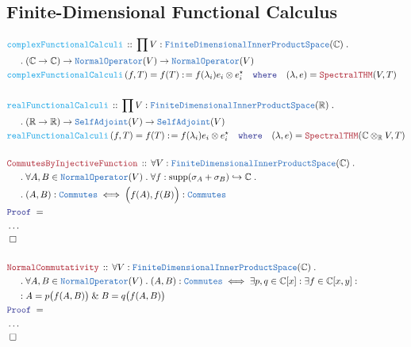 \documentclass[12pt]{scrartcl}%
\newcommand{\TYPE}[1]{\textcolor{NavyBlue}{\mathtt{#1}}}%
\newcommand{\FUNC}[1]{\textcolor{Cerulean}{\mathtt{#1}}}%
\newcommand{\LOGIC}[1]{\textcolor{Blue}{\mathtt{#1}}}%
\newcommand{\THM}[1]{\textcolor{Maroon}{\mathtt{#1}}}%
\renewcommand{\.}{\; . \;} %
\newcommand{\de}{: \kern 0.1pc =} %
\newcommand{\where}{\LOGIC{where}} %
\newcommand{\Act}[1]{\left( #1 \right)} %
\newcommand{\Theorem}[2]{& \THM{#1} \, :: \, #2 \\ & \Proof = \\ } %
\newcommand{\DeclareFunc}[2]{& \FUNC{#1} \, :: \, #2 \\}%
\newcommand{\DefineNamedFunc}[4]{&  \FUNC{#1}\Act{#2} = #3 \de #4 \\}%
\newcommand{\NewLine}{\\ & \kern 1pc}%
\newcommand{\Page}[1]{ \begin{align*} #1 \end{align*}  }%
\newcommand{\NoProof}{ & \ldots \\ \EndProof}%
\renewcommand{\And}{\; \& \;}%
\newcommand{\Reals}{\mathbb{R}}%
\newcommand{\Complex}{\mathbb{C}}%
\DeclareMathOperator*{\supp}{supp}%
\newcommand{\ToInj}{\hookrightarrow} %
\newcommand{\QED}{\; \square} %
\newcommand{\EndProof}{& \QED \\} %
\newcommand{\Proof}{\LOGIC{Proof} \; } %
\newcommand{\FDIPS}{\TYPE{FiniteDimensionalInnerProductSpace}}
\newcommand{\NO}{\TYPE{NormalOperator}}
\newcommand{\SA}{\TYPE{SelfAdjoint}}
\begin{document}
\subsection{Finite-Dimensional Functional Calculus}
\Page{
	\DeclareFunc{complexFunctionalCalculi}{\prod V : \FDIPS(\Complex) \. \NewLine \. (\Complex \to \Complex) \to \NO(V) \to \NO(V)}
	\DefineNamedFunc{complexFunctionalCalculi}{ f,T}{f(T)}{ f(\lambda_i)e_i \otimes e_i^\star \quad \where \quad (\lambda, e) = \THM{SpectralTHM}(V,T)  }
	\\
	\DeclareFunc{realFunctionalCalculi}{\prod V : \FDIPS(\Reals) \.  \NewLine \. (\Reals \to \Reals) \to \SA(V) \to \SA(V)}
	\DefineNamedFunc{realFunctionalCalculi}{ f,T}{f(T)}{ f(\lambda_i)e_i \otimes e_i^\star \quad \where \quad (\lambda, e) = \THM{SpectralTHM}(\Complex \otimes_{\Reals} V,T)  }
	\\
	\Theorem{CommutesByInjectiveFunction}{
			\forall V : \FDIPS(\Complex) \. \NewLine \.  
			\forall A,B \in \NO(V) \. 
			\forall f : \supp (\sigma_A + \sigma_B) \ToInj \Complex \. \NewLine \. 
			(A,B) : \TYPE{Commutes} \iff \Big(f(A),f(B)\Big) : \TYPE{Commutes} 
		}
	\NoProof
	\\
	\Theorem{NormalCommutativity}{
		\forall V : \FDIPS(\Complex) \. \NewLine \.  
		\forall A,B \in \NO(V) \. 
		(A,B) : \TYPE{Commutes} \iff 
		\exists p,q \in \Complex[x] :
		\exists f \in \Complex[x,y] : \NewLine :
		A = p\big(f(A,B)\big) \And
		B = q\big(f(A,B)\big)
	}
	\NoProof
}
\newpage
\end{document}
